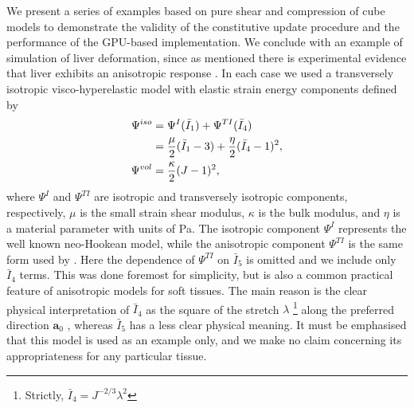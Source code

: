 We present a series of examples based on pure shear and compression of cube models to demonstrate the validity of the constitutive update procedure and the performance of the GPU-based implementation. We conclude with an example of simulation of liver deformation, since as mentioned there is experimental evidence that liver exhibits an anisotropic response \citep{Chui07}. In each case we used a transversely isotropic visco-hyperelastic model with elastic strain energy components defined by
\begin{align}
\Psi^{iso} &= \Psi^{I}(\bar{I}_1) + \Psi^{TI}(\bar{I}_4) \notag \\
&= \dfrac{\mu}{2} (\bar{I}_1 - 3) + \dfrac{\eta}{2} (\bar{I}_4 - 1)^2, \\
\Psi^{vol} &= \dfrac{\kappa}{2} (J - 1)^2,
\end{align}
where $ \Psi^{I} $ and $ \Psi^{TI} $ are isotropic and transversely isotropic components, respectively, $ \mu $ is the small strain shear modulus, $ \kappa $ is the bulk modulus, and $ \eta $ is a material parameter with units of Pa. The isotropic component $ \Psi^{I} $ represents the well known neo-Hookean model, while the anisotropic component $ \Psi^{TI} $ is the same form used by \cite{Picinbono01}. Here the dependence of $ \Psi^{TI} $ on $ \bar{I}_5 $ is omitted and we include only $ \bar{I}_4 $ terms. This was done foremost for simplicity, but is also a common practical feature of anisotropic models for soft tissues. The main reason is the clear physical interpretation of $ \bar{I}_4 $ as the square of the stretch $ \lambda $ \footnote{Strictly, $ \bar{I}_4 = J^{-2/3} \lambda^2 $} along the preferred direction $ \mathbf{a}_0 $ \citep{Holzapfel00}, whereas $ \bar{I}_5 $ has a less clear physical meaning. It must be emphasised that this model is used as an example only, and we make no claim concerning its appropriateness for any particular tissue.

\bigskip

